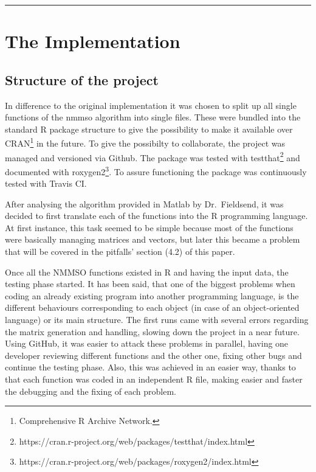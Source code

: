 \documentclass[12pt,a4paper]{article}
\begin{document}
\begin{center}\rule{0.5\linewidth}{\linethickness}\end{center}

\section{The Implementation}\label{the-implementation}

\subsection{Structure of the project}\label{structure-of-the-project}

In difference to the original implementation it was chosen to split up
all single functions of the nmmso algorithm into single files. These
were bundled into the standard R package structure to give the
possibility to make it available over CRAN\footnote{Comprehensive R
  Archive Network.} in the future. To give the possibilty to
collaborate, the project was managed and versioned via Github. The
package was tested with testthat\footnote{https://cran.r-project.org/web/packages/testthat/index.html}
and documented with roxygen2\footnote{https://cran.r-project.org/web/packages/roxygen2/index.html}.
To assure functioning the package was continuously tested with Travis
CI.

After analysing the algorithm provided in Matlab by Dr.~Fieldsend, it
was decided to first translate each of the functions into the R
programming language. At first instance, this task seemed to be simple
because most of the functions were basically managing matrices and
vectors, but later this became a problem that will be covered in the
pitfalls' section (4.2) of this paper.

Once all the NMMSO functions existed in R and having the input data, the
testing phase started. It has been said, that one of the biggest
problems when coding an already existing program into another
programming language, is the different behaviours corresponding to each
object (in case of an object-oriented language) or its main structure.
The first runs came with several errors regarding the matrix generation
and handling, slowing down the project in a near future. Using GitHub,
it was easier to attack these problems in parallel, having one developer
reviewing different functions and the other one, fixing other bugs and
continue the testing phase. Also, this was achieved in an easier way,
thanks to that each function was coded in an independent R file, making
easier and faster the debugging and the fixing of each problem.
\end{document}
